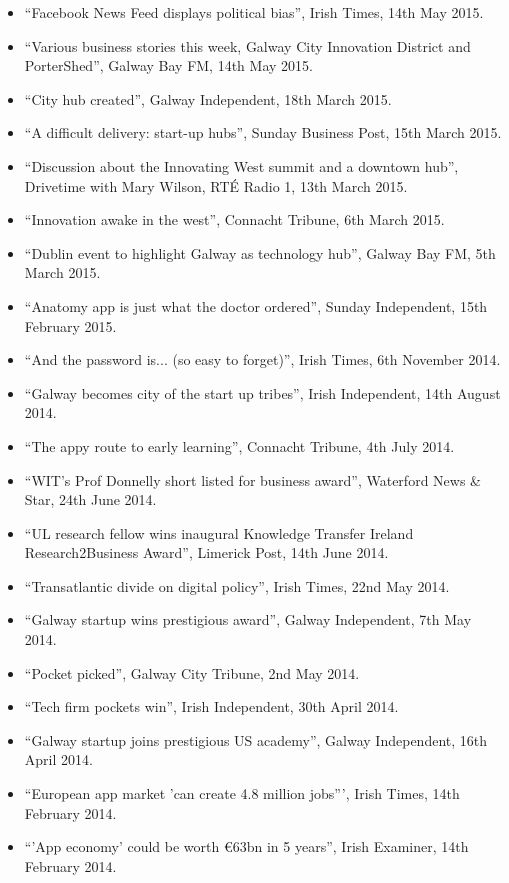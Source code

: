 \documentclass[10pt,a4paper]{res} %
\begin{document}
\begin{resume}
{\begin{itemize}
\item ``Facebook News Feed displays political bias'', Irish Times, 14th May 2015.
\item ``Various business stories this week, Galway City Innovation District and PorterShed'', Galway Bay FM, 14th May 2015.
\item ``City hub created'', Galway Independent, 18th March 2015.
\item ``A difficult delivery: start-up hubs'', Sunday Business Post, 15th March 2015.
\item ``Discussion about the Innovating West summit and a downtown hub'', Drivetime with Mary Wilson, RT\'{E} Radio 1, 13th March 2015.
\item ``Innovation awake in the west'', Connacht Tribune, 6th March 2015.
\item ``Dublin event to highlight Galway as technology hub'', Galway Bay FM, 5th March 2015.
\item ``Anatomy app is just what the doctor ordered'', Sunday Independent, 15th February 2015.
\item ``And the password is... (so easy to forget)'', Irish Times, 6th November 2014.
\item ``Galway becomes city of the start up tribes'', Irish Independent, 14th August 2014.
\item ``The appy route to early learning'', Connacht Tribune, 4th July 2014.
\item ``WIT's Prof Donnelly short listed for business award'', Waterford News \& Star, 24th June 2014.
\item ``UL research fellow wins inaugural Knowledge Transfer Ireland Research2Business Award'', Limerick Post, 14th June 2014.
\item ``Transatlantic divide on digital policy'', Irish Times, 22nd May 2014.
\item ``Galway startup wins prestigious award'', Galway Independent, 7th May 2014.
\item ``Pocket picked'', Galway City Tribune, 2nd May 2014.
\item ``Tech firm pockets win'', Irish Independent, 30th April 2014.
\item ``Galway startup joins prestigious US academy'', Galway Independent, 16th April 2014.
\item ``European app market 'can create 4.8 million jobs''', Irish Times, 14th February 2014.
\item ``'App economy' could be worth \euro{}63bn in 5 years'', Irish Examiner, 14th February 2014.

\end{itemize}}
\end{resume}
\end{document}
